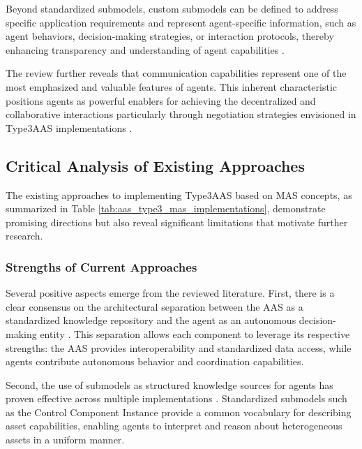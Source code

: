 Beyond standardized submodels, custom submodels can be defined to address specific application requirements and represent agent-specific information, such as agent behaviors, decision-making strategies, or interaction protocols, thereby enhancing transparency and understanding of agent capabilities \cite{Sakurada2025_MAS_AAS_Type3}.

The review further reveals that communication capabilities represent one of the most emphasized and valuable features of agents. This inherent characteristic positions agents as powerful enablers for achieving the decentralized and collaborative interactions particularly through negotiation strategies envisioned in \ac{Type3AAS} implementations \cite{Sakurada2025_MAS_AAS_Type3}.


\subsection{Critical Analysis of Existing Approaches}
\label{subsec:critical_analysis}

The existing approaches to implementing \ac{Type3AAS} based on \ac{MAS} concepts, as summarized in Table \ref{tab:aas_type3_mas_implementations}, demonstrate promising directions but also reveal significant limitations that motivate further research.

\subsubsection{Strengths of Current Approaches}

Several positive aspects emerge from the reviewed literature. First, there is a clear consensus on the architectural separation between the \ac{AAS} as a standardized knowledge repository and the agent as an autonomous decision-making entity \cite{vogel2021approach, sakurada2022engineering}. This separation allows each component to leverage its respective strengths: the \ac{AAS} provides interoperability and standardized data access, while agents contribute autonomous behavior and coordination capabilities.

Second, the use of submodels as structured knowledge sources for agents has proven effective across multiple implementations \cite{jungbluth2022dynamic, Sakurada2025_MAS_AAS_Type3}. Standardized submodels such as the Control Component Instance \cite{idta2023controlcomponent} provide a common vocabulary for describing asset capabilities, enabling agents to interpret and reason about heterogeneous assets in a uniform manner.


